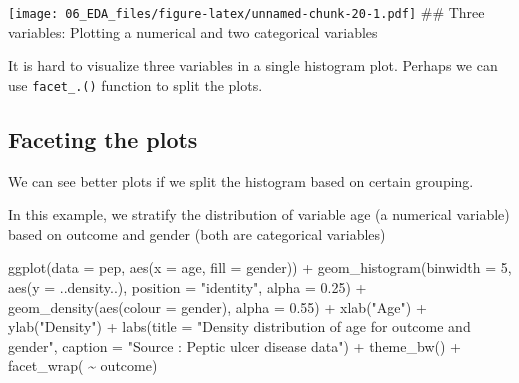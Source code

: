 \documentclass[
  10pt,
]{krantz}
\newenvironment{Shaded}{\begin{snugshade}}{\end{snugshade}}
\newcommand{\AttributeTok}[1]{\textcolor[rgb]{0.77,0.63,0.00}{#1}}
\newcommand{\DecValTok}[1]{\textcolor[rgb]{0.00,0.00,0.81}{#1}}
\newcommand{\FloatTok}[1]{\textcolor[rgb]{0.00,0.00,0.81}{#1}}
\newcommand{\FunctionTok}[1]{\textcolor[rgb]{0.00,0.00,0.00}{#1}}
\newcommand{\NormalTok}[1]{#1}
\newcommand{\SpecialCharTok}[1]{\textcolor[rgb]{0.00,0.00,0.00}{#1}}
\newcommand{\StringTok}[1]{\textcolor[rgb]{0.31,0.60,0.02}{#1}}
\begin{document}
\texttt{[image: 06\_EDA\_files/figure-latex/unnamed-chunk-20-1.pdf]}
\#\# Three variables: Plotting a numerical and two categorical variables

It is hard to visualize three variables in a single histogram plot. Perhaps we can use \texttt{facet\_.()} function to split the plots.

\hypertarget{faceting-the-plots}{%
\subsection{\texorpdfstring{Faceting the plots}{Faceting the plots}}\label{faceting-the-plots}}

We can see better plots if we split the histogram based on certain grouping.

In this example, we stratify the distribution of variable age (a numerical variable) based on outcome and gender (both are categorical variables)

\begin{Shaded}
\begin{Highlighting}[]
\FunctionTok{ggplot}\NormalTok{(}\AttributeTok{data =}\NormalTok{ pep, }\FunctionTok{aes}\NormalTok{(}\AttributeTok{x =}\NormalTok{ age, }\AttributeTok{fill =}\NormalTok{ gender)) }\SpecialCharTok{+}
    \FunctionTok{geom\_histogram}\NormalTok{(}\AttributeTok{binwidth =} \DecValTok{5}\NormalTok{, }\FunctionTok{aes}\NormalTok{(}\AttributeTok{y =}\NormalTok{ ..density..),  }
                   \AttributeTok{position =} \StringTok{"identity"}\NormalTok{, }\AttributeTok{alpha =} \FloatTok{0.25}\NormalTok{) }\SpecialCharTok{+} 
  \FunctionTok{geom\_density}\NormalTok{(}\FunctionTok{aes}\NormalTok{(}\AttributeTok{colour =}\NormalTok{ gender), }\AttributeTok{alpha =} \FloatTok{0.55}\NormalTok{) }\SpecialCharTok{+}
  \FunctionTok{xlab}\NormalTok{(}\StringTok{"Age"}\NormalTok{) }\SpecialCharTok{+}
  \FunctionTok{ylab}\NormalTok{(}\StringTok{"Density"}\NormalTok{) }\SpecialCharTok{+}
  \FunctionTok{labs}\NormalTok{(}\AttributeTok{title =} \StringTok{"Density distribution of age for outcome and gender"}\NormalTok{,}
       \AttributeTok{caption =} \StringTok{"Source : Peptic ulcer disease data"}\NormalTok{) }\SpecialCharTok{+}
  \FunctionTok{theme\_bw}\NormalTok{() }\SpecialCharTok{+}
  \FunctionTok{facet\_wrap}\NormalTok{( }\SpecialCharTok{\textasciitilde{}}\NormalTok{ outcome)}
\end{Highlighting}
\end{Shaded}
\end{document}
